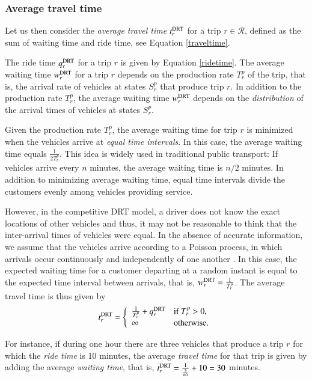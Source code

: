 \documentclass[dissertation,draft*]{aaltoseries}
\begin{document}
\subsubsection{Average travel time}
\label{averagetraveltime}
Let us then consider the \emph{average travel time} $t_{r}^{\rm DRT}$ for a trip $r \in \mathcal{R}$, 
defined as the sum of waiting time and ride time, see Equation \eqref{traveltime}.

The ride time $q_r^{\rm DRT}$ for a trip $r$ is given by Equation \eqref{ridetime}.
The average waiting time $w_r^{\rm DRT}$ for a trip $r$ depends on the production rate $T_r^p$ of the trip, 
that is, the arrival rate of vehicles at states $S_r^p$ that produce trip $r$.
In addition to the production rate $T_r^p$, the average waiting time $w_r^{\rm DRT}$ depends on
the \emph{distribution} of the arrival times of vehicles at states $S_r^p$.

Given the production rate $T_r^p$, the average waiting time for trip $r$ is minimized when the 
vehicles arrive at \emph{equal time intervals}. In this case, the average waiting time equals 
$\frac{1}{2T_r^p}$. This idea is widely used in traditional public transport:
If vehicles arrive every $n$ minutes, the average waiting time is $n/2$ minutes. 
In addition to minimizing average waiting time, equal time intervals divide 
the customers evenly among vehicles providing service.

However, in the competitive DRT model, a driver does not know the exact locations
of other vehicles and thus, it may not be reasonable to think that the inter-arrival times
of vehicles were equal. 
In the absence of accurate information, we assume that the vehicles arrive according to a Poisson process, in which 
arrivals occur continuously and independently of one another \citep{ross}.
In this case, the
expected waiting time for a customer departing at a random instant is equal to the expected 
time interval between arrivals, that is, $w_r^{\rm DRT} = \frac {1}{T_{r}^p}$.
The average travel time is thus given by
\begin{align}
\label{ajoaika}
t_{r}^{\rm DRT}= 
\left\{
\begin{array}{ll}
\frac {1}{T_{r}^p} + q_r^{\rm DRT} & \mbox{if } T_{r}^p > 0, \\
\infty & \mbox{otherwise.}
\end{array}
\right.
\end{align}

For instance, if during one hour there are three vehicles that produce a trip $r$ 
for which the \emph{ride time} is 10 minutes, the average \emph{travel time} for that trip
is given by adding the average \emph{waiting time}, that is, $t_{r}^{\rm DRT}= \frac {1}{\frac{3}{60}}  + 10 = 30$ minutes.
\end{document}
